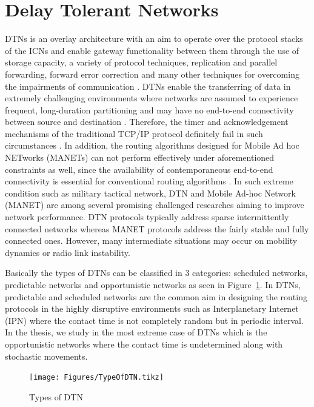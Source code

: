 \section{Delay Tolerant Networks}
\label{bg:Delay Tolerant Networks}
DTNs is an overlay architecture with an aim to operate over the protocol stacks of the ICNs and enable gateway functionality between them through the use of storage capacity, a variety of protocol techniques, replication and parallel forwarding, forward error correction and many other techniques for overcoming the impairments of communication  \cite{Khabbaz2012}.
DTNs enable the transferring of data in extremely challenging environments where networks are assumed to experience frequent, long-duration partitioning and may have no end-to-end connectivity between source and destination \cite{Liu2011}. 
Therefore, the timer and acknowledgement mechanisms of the traditional TCP/IP protocol definitely fail in such circumstances \cite{Souza2010}.
In addition, the routing algorithms designed for Mobile Ad hoc NETworks (MANETs) can not perform effectively under aforementioned constraints as well, since the availability of contemporaneous end-to-end connectivity is essential for conventional routing algorithms \cite{Yue2013}.
%
In such extreme condition such as military tactical network, DTN and Mobile Ad-hoc Network (MANET) are among several promising challenged researches aiming to improve network performance. 
DTN protocols typically address sparse intermittently connected networks whereas MANET protocols address the fairly stable and fully connected ones. However, many intermediate situations may occur on mobility dynamics or radio link instability. 

Basically the types of DTNs can be classified in 3 categories: scheduled networks, predictable networks and opportunistic networks as seen in Figure~\ref{fig:bg:Type of DTN}.
In DTNs, predictable and scheduled networks are the common aim in designing the routing protocols in the highly disruptive environments such as Interplanetary Internet (IPN) \cite{Burleigh2003} where the contact time is not completely random but in periodic interval.
In the thesis, we study in the most extreme case of DTNs which is the opportunistic networks where the contact time is undetermined along with stochastic movements.


\begin{figure}
\centering
\texttt{[image: Figures/TypeOfDTN.tikz]}

%
\caption{Types of DTN}
\label{fig:bg:Type of DTN}
\end{figure} 


